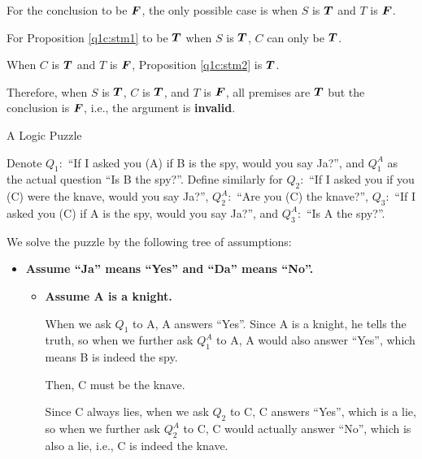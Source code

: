 \documentclass[answers]{exam}
\begin{document}
\begin{questions}
\begin{parts}
\begin{solution}
            For the conclusion to be $\bm{F}$, the only possible case is when $S$ is $\bm{T}$ and
            $T$ is $\bm{F}$.

            For Proposition \ref{q1c:stm1} to be $\bm{T}$ when $S$ is $\bm{T}$, $C$ can only be
            $\bm{T}$.
            
            When $C$ is $\bm{T}$ and $T$ is $\bm{F}$, Proposition \ref{q1c:stm2} is $\bm{T}$.

            Therefore, when $S$ is $\bm{T}$, $C$ is $\bm{T}$, and $T$ is $\bm{F}$, all premises
            are $\bm{T}$ but the conclusion is $\bm{F}$, i.e., the argument is \textbf{invalid}.
        \end{solution}

    \end{parts}

    \question A Logic Puzzle

    \begin{solution}
        Denote $Q_1:$ ``If I asked you (A) if B is the spy, would you say Ja?'',
        and $Q^A_1$ as the actual question ``Is B the spy?''. Define similarly for
        $Q_2:$ ``If I asked you if you (C) were the knave, would you say Ja?'',
        $Q^A_2:$ ``Are you (C) the knave?'',
        $Q_3:$ ``If I asked you (C) if A is the spy, would you say Ja?'',
        and $Q^A_3:$ ``Is A the spy?''.

        We solve the puzzle by the following tree of assumptions:
        \begin{itemize}
            \item \textbf{Assume ``Ja'' means ``Yes'' and ``Da'' means ``No''.}
            \begin{itemize}
                \item \textbf{Assume A is a knight.}
                
                When we ask $Q_1$ to A, A answers ``Yes''.
                Since A is a knight, he tells the truth, so when we further ask $Q^A_1$ to A,
                A would also answer ``Yes'', which means B is indeed the spy.
                
                Then, C must be the knave.
                
                Since C always lies, when we ask $Q_2$ to C,
                C answers ``Yes'', which is a lie, so when we further ask $Q^A_2$ to C,
                C would actually answer ``No'', which is also a lie, i.e., C is indeed
                the knave.
                

\end{itemize}
\end{itemize}
\end{solution}
\end{questions}
\end{document}
